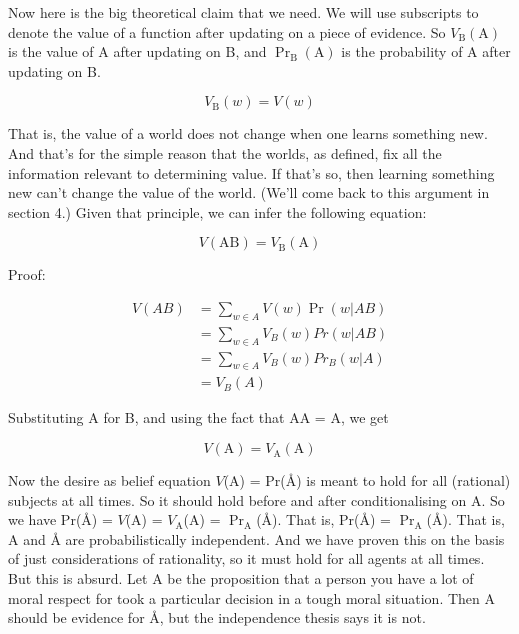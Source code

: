 Now here is the big theoretical claim that we need. We will use subscripts to denote the value of a function after updating on a piece of evidence. So $V_\text{B}(\text{A})$ is the value of A after updating on B, and $\Pr_\text{B}(\text{A})$ is the probability of A after updating on B.

$$V_\text{B}(w) = V(w)$$

That is, the value of a world does not change when one learns something new. And that's for the simple reason that the worlds, as defined, fix all the information relevant to determining value. If that's so, then learning something new can't change the value of the world. (We'll come back to this argument in section 4.) Given that principle, we can infer the following equation:

$$V(\text{AB}) = V_\text{B}(\text{A})$$

Proof:

\begin{align*}
V(AB) &= \sum_{w \in A} V(w) \Pr(w | AB) \\
&= \sum_{w \in A} V_B(w) Pr(w | AB) \\
&= \sum_{w \in A} V_B(w) Pr_B(w | A) \\
&= V_B(A)
\end{align*}

Substituting A for B, and using the fact that AA = A, we get

$$V(\text{A}) = V_\text{A}(\text{A})$$

Now the desire as belief equation $V$(A) = Pr(Å) is meant to hold for all (rational) subjects at all times. So it should hold before and after conditionalising on A. So we have Pr(Å) = $V$(A) = $V_\text{A}$(A) = $\Pr_\text{A}$(Å). That is, Pr(Å) = $\Pr_\text{A}$(Å). That is, A and Å are probabilistically independent. And we have proven this on the basis of just considerations of rationality, so it must hold for all agents at all times. But this is absurd. Let A be the proposition that a person you have a lot of moral respect for took a particular decision in a tough moral situation. Then A should be evidence for Å, but the independence thesis says it is not.

